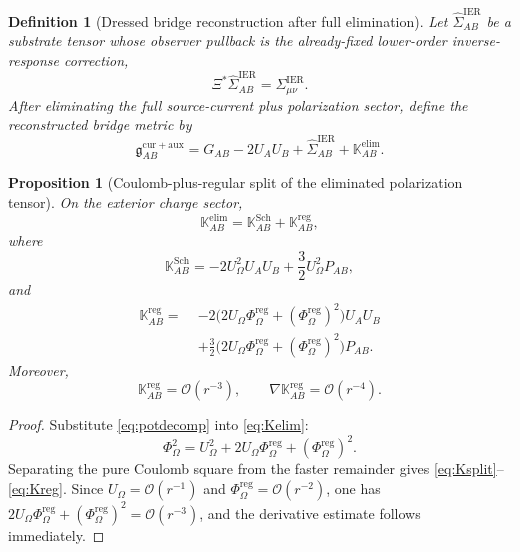 \documentclass[11pt]{article}
\newcommand{\BridgeMetric}{\mathfrak g}
\newcommand{\ObserverMap}{\Xi}
\newcommand{\ProjSub}{P}
\newcommand{\FlowPot}{\Phi_\Omega}
\newcommand{\FlowPotReg}{\Phi_\Omega^{\mathrm{reg}}}
\newcommand{\CoulPot}{U_\Omega}
\newcommand{\SigmaIER}{\Sigma^{\mathrm{IER}}}
\newcommand{\LiftIER}{\widehat\Sigma^{\mathrm{IER}}}
\newcommand{\AuxPol}{\mathbb K}
\newtheorem{definition}{Definition}
\newtheorem{proposition}{Proposition}
\begin{document}
\begin{definition}[Dressed bridge reconstruction after full elimination]
\label{def:bridge}
Let \(\LiftIER_{AB}\) be a substrate tensor whose observer pullback is the already-fixed lower-order inverse-response correction,
\begin{equation}
\ObserverMap^\ast\LiftIER_{AB}=\SigmaIER_{\mu\nu}.
\label{eq:liftier}
\end{equation}
After eliminating the full source-current plus polarization sector, define the reconstructed bridge metric by
\begin{equation}
\BridgeMetric_{AB}^{\mathrm{cur+aux}}
=
G_{AB}
-2U_AU_B
+\LiftIER_{AB}
+\AuxPol_{AB}^{\mathrm{elim}}.
\label{eq:bridge}
\end{equation}
\end{definition}

\begin{proposition}[Coulomb-plus-regular split of the eliminated polarization tensor]
\label{prop:split}
On the exterior charge sector,
\begin{equation}
\AuxPol_{AB}^{\mathrm{elim}}
=
\AuxPol_{AB}^{\mathrm{Sch}}
+\AuxPol_{AB}^{\mathrm{reg}},
\label{eq:Ksplit}
\end{equation}
where
\begin{equation}
\AuxPol_{AB}^{\mathrm{Sch}}
=
-2\CoulPot^2U_AU_B
+\frac32\CoulPot^2\ProjSub_{AB},
\label{eq:Ksch}
\end{equation}
and
\begin{align}
\AuxPol_{AB}^{\mathrm{reg}}
=\;&
-2\bigl(2\CoulPot\FlowPotReg+(\FlowPotReg)^2\bigr)U_AU_B
\nonumber\\
&+\frac32\bigl(2\CoulPot\FlowPotReg+(\FlowPotReg)^2\bigr)\ProjSub_{AB}.
\label{eq:Kreg}
\end{align}
Moreover,
\begin{equation}
\AuxPol_{AB}^{\mathrm{reg}}=\mathcal O(r^{-3}),
\qquad
\nabla\AuxPol_{AB}^{\mathrm{reg}}=\mathcal O(r^{-4}).
\label{eq:Kregdecay}
\end{equation}
\end{proposition}

\begin{proof}
Substitute \eqref{eq:potdecomp} into \eqref{eq:Kelim}:
\[
\FlowPot^2=\CoulPot^2+2\CoulPot\FlowPotReg+(\FlowPotReg)^2.
\]
Separating the pure Coulomb square from the faster remainder gives \eqref{eq:Ksplit}--\eqref{eq:Kreg}. Since \(\CoulPot=\mathcal O(r^{-1})\) and \(\FlowPotReg=\mathcal O(r^{-2})\), one has \(2\CoulPot\FlowPotReg+(\FlowPotReg)^2=\mathcal O(r^{-3})\), and the derivative estimate follows immediately.
\end{proof}
\end{document}
